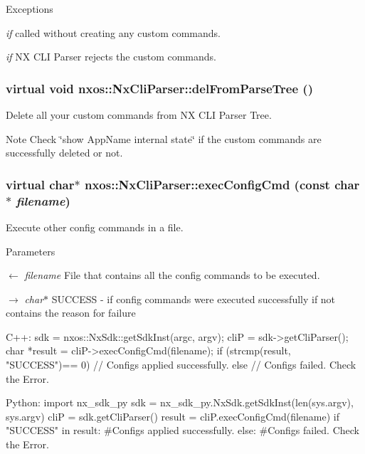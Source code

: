 \begin{DoxyExceptions}{Exceptions}
\item[{\em if}]called without creating any custom commands. \item[{\em if}]NX CLI Parser rejects the custom commands. \end{DoxyExceptions}
\hypertarget{classnxos_1_1NxCliParser_a169976099ecf7a05277bfc72259ff1bc}{
\subsubsection[{delFromParseTree}]{\setlength{\rightskip}{0pt plus 5cm}virtual void nxos::NxCliParser::delFromParseTree ()}}
\label{classnxos_1_1NxCliParser_a169976099ecf7a05277bfc72259ff1bc}
Delete all your custom commands from NX CLI Parser Tree. \begin{DoxyNote}{Note}
Check \char`\"{}show AppName internal state\char`\"{} if the custom commands are successfully deleted or not. 
\end{DoxyNote}
\hypertarget{classnxos_1_1NxCliParser_aa22ee0395ceadc46a3e28b93c5a5b75e}{
\subsubsection[{execConfigCmd}]{\setlength{\rightskip}{0pt plus 5cm}virtual char$\ast$ nxos::NxCliParser::execConfigCmd (const char $\ast$ {\em filename})}}
\label{classnxos_1_1NxCliParser_aa22ee0395ceadc46a3e28b93c5a5b75e}
Execute other config commands in a file. 
\begin{DoxyParams}{Parameters}
\item[\mbox{$\leftarrow$} {\em filename}]File that contains all the config commands to be executed. \item[\mbox{$\rightarrow$} {\em char$\ast$}]SUCCESS -\/ if config commands were executed successfully if not contains the reason for failure 
\begin{DoxyCode}
  C++:
       sdk = nxos::NxSdk::getSdkInst(argc, argv);
       cliP = sdk->getCliParser();
       char *result = cliP->execConfigCmd(filename);
       if (strcmp(result, "SUCCESS")== 0) {
           // Configs applied successfully.
       } else {
           // Configs failed. Check the Error.
       }

  Python:
       import nx_sdk_py
       sdk = nx_sdk_py.NxSdk.getSdkInst(len(sys.argv), sys.argv)
       cliP = sdk.getCliParser()
       result = cliP.execConfigCmd(filename)
       if "SUCCESS" in result:
           #Configs applied successfully.
       else:
           #Configs failed. Check the Error.
\end{DoxyCode}
 \end{DoxyParams}
